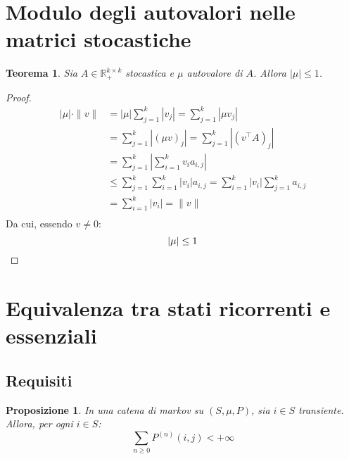 \documentclass{article}
\theoremstyle{plain}
\newtheorem{thm}{Teorema}
\newtheorem{prop}{Proposizione}
\newcommand{\R}{\mathbb R}
\newcommand{\Rp}{\R_+}
\newcommand{\abs}[1]{\left|#1\right|}
\newcommand{\norm}[1]{\|#1\|}
\newcommand{\tra}{^\top}
\newcommand{\ape}[1]{^{(#1)}}
\begin{document}
\section{Modulo degli autovalori nelle matrici stocastiche}

\begin{thm}
	Sia $A\in\Rp^{k\times k}$ stocastica e $\mu$ autovalore di $A$. Allora $\abs{\mu}\le 1$.
\end{thm}
\begin{proof}
	\begin{align*}
		\abs{\mu}\cdot\norm{v} & = \abs{\mu}\sum_{j=1}^k\abs{v_j} = \sum_{j=1}^k\abs {\mu v_j}                                 \\
		                       & = \sum_{j=1}^k\abs {(\mu v)_j} = \sum_{j=1}^k\abs {(v\tra A)_j}                               \\
		                       & = \sum_{j=1}^k\abs {\sum_{i=1}^k v_i a_{i,j}}                                                 \\
		                       & \le \sum_{j=1}^k \sum_{i=1}^k \abs{v_i} a_{i,j} = \sum_{i=1}^k \abs{v_i} \sum_{j=1}^k a_{i,j} \\
		                       & = \sum_{i=1}^k \abs{v_i} = \norm{v}                                                           \\
	\end{align*}
	Da cui, essendo $v\neq 0$:
	\begin{equation*}
		\abs{\mu}\leq 1 \qedhere
	\end{equation*}
\end{proof}




\section{Equivalenza tra stati ricorrenti e essenziali}


\subsection{Requisiti}
\begin{prop}\label{prop:sumtrans}
	In una catena di markov su $(S,\mu,P)$, sia $i\in S$ transiente. Allora, per ogni $i\in S$:
	\begin{equation*}
		\sum_{n\ge0}P\ape{n}(i,j)<+\infty
	\end{equation*}
\end{prop}
\end{document}
